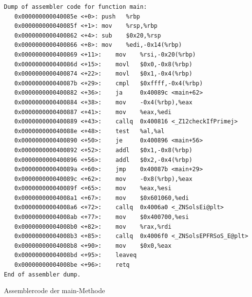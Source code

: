 \documentclass[12pt]{article}
\begin{document}
\begin{code}
\begin{lstlisting}
Dump of assembler code for function main:
   0x000000000040085e <+0>:	push   %rbp
   0x000000000040085f <+1>:	mov    %rsp,%rbp
   0x0000000000400862 <+4>:	sub    $0x20,%rsp
   0x0000000000400866 <+8>:	mov    %edi,-0x14(%rbp)
   0x0000000000400869 <+11>:	mov    %rsi,-0x20(%rbp)
   0x000000000040086d <+15>:	movl   $0x0,-0x8(%rbp)
   0x0000000000400874 <+22>:	movl   $0x1,-0x4(%rbp)
   0x000000000040087b <+29>:	cmpl   $0xffff,-0x4(%rbp)
   0x0000000000400882 <+36>:	ja     0x40089c <main+62>
   0x0000000000400884 <+38>:	mov    -0x4(%rbp),%eax
   0x0000000000400887 <+41>:	mov    %eax,%edi
   0x0000000000400889 <+43>:	callq  0x400816 <_Z12checkIfPrimej>
   0x000000000040088e <+48>:	test   %al,%al
   0x0000000000400890 <+50>:	je     0x400896 <main+56>
   0x0000000000400892 <+52>:	addl   $0x1,-0x8(%rbp)
   0x0000000000400896 <+56>:	addl   $0x2,-0x4(%rbp)
   0x000000000040089a <+60>:	jmp    0x40087b <main+29>
   0x000000000040089c <+62>:	mov    -0x8(%rbp),%eax
   0x000000000040089f <+65>:	mov    %eax,%esi
   0x00000000004008a1 <+67>:	mov    $0x601060,%edi
   0x00000000004008a6 <+72>:	callq  0x4006a0 <_ZNSolsEi@plt>
   0x00000000004008ab <+77>:	mov    $0x400700,%esi
   0x00000000004008b0 <+82>:	mov    %rax,%rdi
   0x00000000004008b3 <+85>:	callq  0x4006f0 <_ZNSolsEPFRSoS_E@plt>
   0x00000000004008b8 <+90>:	mov    $0x0,%eax
   0x00000000004008bd <+95>:	leaveq 
   0x00000000004008be <+96>:	retq   
End of assembler dump.
\end{lstlisting}
\caption[Assemblercode der main Methode]{Assemblercode der main-Methode}
\end{code}
\end{document}
